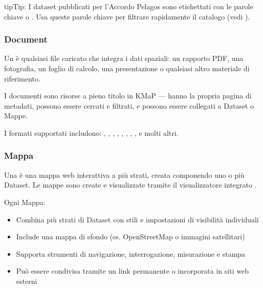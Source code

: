 \documentclass[letterpaper,10pt,english]{sphinxmanual}
\begin{document}
\begin{sphinxadmonition}{tip}{Tip:}
\sphinxAtStartPar
I dataset pubblicati per l’Accordo Pelagos sono etichettati con le parole chiave
 o . Usa queste parole chiave per filtrare
rapidamente il catalogo (vedi {\hyperref[\detokenize{it/02_trovare_visualizzare:find-it}]{}}).
\end{sphinxadmonition}


\subsubsection{Document}
\label{\detokenize{it/01_benvenuto:document}}
\sphinxAtStartPar
Un  è qualsiasi file caricato che integra i dati spaziali: un rapporto PDF,
una fotografia, un foglio di calcolo, una presentazione o qualsiasi altro materiale
di riferimento.

\sphinxAtStartPar
I documenti sono risorse a pieno titolo in KMaP — hanno la propria pagina di metadati,
possono essere cercati e filtrati, e possono essere collegati a Dataset o Mappe.

\sphinxAtStartPar
I formati supportati includono: , , , , ,
, , ,  e molti altri.


\subsubsection{Mappa}
\label{\detokenize{it/01_benvenuto:mappa}}
\sphinxAtStartPar
Una  è una mappa web interattiva a più strati, creata componendo uno o più
Dataset. Le mappe sono create e visualizzate tramite il visualizzatore integrato .

\sphinxAtStartPar
Ogni Mappa:
\begin{itemize}
\item {} 
\sphinxAtStartPar
Combina più strati di Dataset con stili e impostazioni di visibilità individuali

\item {} 
\sphinxAtStartPar
Include una mappa di sfondo (es. OpenStreetMap o immagini satellitari)

\item {} 
\sphinxAtStartPar
Supporta strumenti di navigazione, interrogazione, misurazione e stampa

\item {} 
\sphinxAtStartPar
Può essere condivisa tramite un link permanente o incorporata in siti web esterni

\end{itemize}
\end{document}

